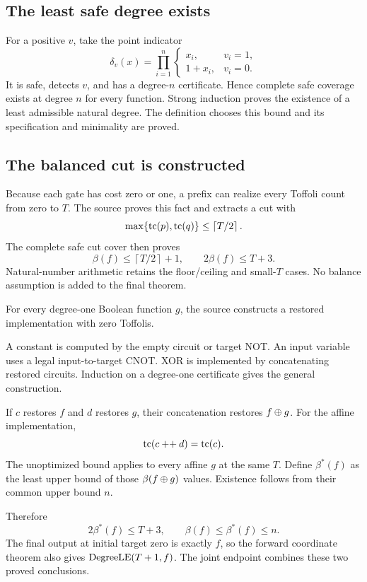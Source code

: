 \subsection*{The least safe degree exists}
For a positive $v$, take the point indicator
\[
\delta_v(x)=\prod_{i=1}^{n}
\begin{cases}
x_i,&v_i=1,\\
1+x_i,&v_i=0.
\end{cases}
\]
It is safe, detects $v$, and has a degree-$n$ certificate. Hence complete safe coverage exists at degree $n$ for every function. Strong induction proves the existence of a least admissible natural degree. The definition  chooses this bound and its specification and minimality are proved.

\subsection*{The balanced cut is constructed}
Because each gate has cost zero or one, a prefix can realize every Toffoli count from zero to $T$. The source proves this fact and extracts a cut with
\[
\max\{\operatorname{tc}(p),\operatorname{tc}(q)\}\le\left\lceil T/2\right\rceil.
\]
The complete safe cut cover then proves
\[
\beta(f)\le\left\lceil T/2\right\rceil+1,
\qquad\boxed{2\beta(f)\le T+3.}
\]
Natural-number arithmetic retains the floor/ceiling and small-$T$ cases. No balance assumption is added to the final theorem.

For every degree-one Boolean function $g$, the source constructs a restored implementation with zero Toffolis.

A constant is computed by the empty circuit or target NOT. An input variable uses a legal input-to-target CNOT. XOR is implemented by concatenating restored circuits. Induction on a degree-one certificate gives the general construction.

If $c$ restores $f$ and $d$ restores $g$, their concatenation restores $f\mathbin{\oplus} g$. For the affine implementation,
\[
\operatorname{tc}(c\mathbin{++}d)=\operatorname{tc}(c).
\]
The unoptimized bound applies to every affine $g$ at the same $T$. Define $\beta^*(f)$ as the least upper bound of those $\beta(f\mathbin{\oplus} g)$ values. Existence follows from their common upper bound $n$.

Therefore
\[
\boxed{2\beta^*(f)\le T+3,\qquad \beta(f)\le\beta^*(f)\le n.}
\]
The final output at initial target zero is exactly $f$, so the forward coordinate theorem also gives $\operatorname{DegreeLE}(T+1,f)$. The joint endpoint combines these two proved conclusions.

